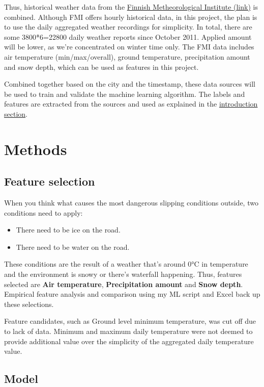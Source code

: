 \documentclass[12pt, a4paper]{report}
\begin{document}
    Thus, historical weather data from the \href{https://en.ilmatieteenlaitos.fi/download-observations}{Finnish Metheorological Institute (link)}
    is combined. Although FMI offers hourly historical data, in this project, the plan is to use the daily aggregated weather recordings for simplicity.
    In total, there are some 3800*6=22800 daily weather reports since October 2011. Applied amount will be lower, as we're concentrated on winter time only.
    The FMI data includes air temperature (min/max/overall), ground temperature, precipitation amount and snow depth, which can be used as features in this project.

    Combined together based on the city and the timestamp, these data sources will be used to train and validate the machine learning algorithm. The labels and features are extracted from the sources and used as explained in the \hyperlink{section.0.1.1}{introduction section}.

    \section{Methods}
    \subsection{Feature selection}
    When you think what causes the most dangerous slipping conditions outside, two conditions need to apply:
    \begin{itemize}
      \item There need to be ice on the road.
      \item There need to be water on the road.
    \end{itemize}
    These conditions are the result of a weather that's around 0°C in temperature and the environment is snowy or there's waterfall happening.
    Thus, features selected are \textbf{Air temperature}, \textbf{Precipitation amount} and \textbf{Snow depth}. Empirical feature analysis 
    and comparison using my ML script and Excel back up these selections. 

    Feature candidates, such as Ground level minimum temperature, was cut off due to lack of data.
    Minimum and maximum daily temperature were not deemed to provide additional value over the simplicity 
    of the aggregated daily temperature value.

    \subsection{Model}
\end{document}
